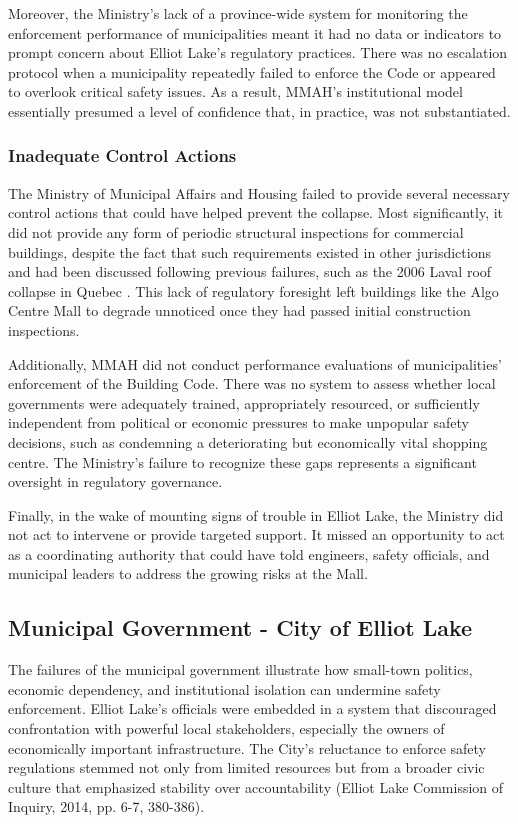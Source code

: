 \documentclass[12pt]{article}
\begin{document}
Moreover, the Ministry's lack of a province-wide system for monitoring the enforcement performance of municipalities meant it had no data or indicators to prompt concern about Elliot Lake's regulatory practices. There was no escalation protocol when a municipality repeatedly failed to enforce the Code or appeared to overlook critical safety issues. As a result, MMAH's institutional model essentially presumed a level of confidence that, in practice, was not substantiated.

\subsubsection*{Inadequate Control Actions}

The Ministry of Municipal Affairs and Housing failed to provide several necessary control actions that could have helped prevent the collapse. Most significantly, it did not provide any form of periodic structural inspections for commercial buildings, despite the fact that such requirements existed in other jurisdictions and had been discussed following previous failures, such as the 2006 Laval roof collapse in Quebec \cite[p406-047]{AlgoLakeReport1}. This lack of regulatory foresight left buildings like the Algo Centre Mall to degrade unnoticed once they had passed initial construction inspections.

Additionally, MMAH did not conduct performance evaluations of municipalities' enforcement of the Building Code. There was no system to assess whether local governments were adequately trained, appropriately resourced, or sufficiently independent from political or economic pressures to make unpopular safety decisions, such as condemning a deteriorating but economically vital shopping centre. The Ministry's failure to recognize these gaps represents a significant oversight in regulatory governance.

Finally, in the wake of mounting signs of trouble in Elliot Lake, the Ministry did not act to intervene or provide targeted support. It missed an opportunity to act as a coordinating authority that could have told engineers, safety officials, and municipal leaders to address the growing risks at the Mall.

\subsection{Municipal Government - City of Elliot Lake}

The failures of the municipal government illustrate how small-town politics, economic dependency, and institutional isolation can undermine safety enforcement. Elliot Lake's officials were embedded in a system that discouraged confrontation with powerful local stakeholders, especially the owners of economically important infrastructure. The City's reluctance to enforce safety regulations stemmed not only from limited resources but from a broader civic culture that emphasized stability over accountability \cite[p6-7, p380-386]{AlgoLakeReport1} (Elliot Lake Commission of Inquiry, 2014, pp. 6-7, 380-386).
\end{document}
